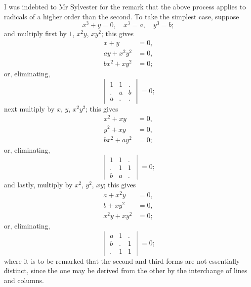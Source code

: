 \documentclass[11pt]{article}
\begin{document}
I was indebted to Mr Sylvester for the remark that the above process applies to radicals of a higher order than the second. To take the simplest case, suppose
\[
x^3 + y = 0, \quad x^3 = a, \quad y^3 = b;
\]
and multiply first by $1$, $x^2y$, $xy^2$; this gives
\begin{align*}
x + y &= 0,\\
ay + x^2y^2 &= 0,\\
bx^2 + xy^2 &= 0;
\end{align*}
or, eliminating,
\[
\begin{vmatrix}
1 & 1 & . \\
. & a & b \\
a & . & .
\end{vmatrix} = 0;
\]
next multiply by $x$, $y$, $x^2y^2$; this gives
\begin{align*}
x^2 + xy &= 0,\\
y^2 + xy &= 0,\\
bx^2 + ay^2 &= 0;
\end{align*}
or, eliminating,
\[
\begin{vmatrix}
1 & 1 & . \\
. & 1 & 1 \\
b & a & .
\end{vmatrix} = 0;
\]
and lastly, multiply by $x^2$, $y^2$, $xy$; this gives
\begin{align*}
a + x^2y &= 0,\\
b + xy^2 &= 0,\\
x^2y + xy^2 &= 0;
\end{align*}
or, eliminating,
\[
\begin{vmatrix}
a & 1 & . \\
b & . & 1 \\
. & 1 & 1
\end{vmatrix} = 0;
\]
where it is to be remarked that the second and third forms are not essentially distinct, since the one may be derived from the other by the interchange of lines and columns.

\newpage
\setcounter{page}{43}
\end{document}
